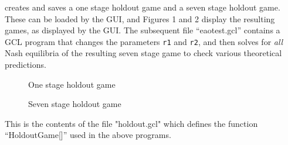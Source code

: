 \noindent
creates and saves a one stage holdout game and a seven stage holdout
game. These can be loaded by the GUI, and Figures 1 and 2 display the
resulting games, as displayed by the GUI.  The subsequent file
``eaotest.gcl'' contains a GCL program that changes the parameters
\verb+r1+ and \verb+r2+, and then solves for {\em all} Nash equilibria
of the resulting seven stage game to check various theoretical predictions.

\begin{figure}[htp]
\caption{One stage holdout game}
\end{figure}
\begin{figure}[htp]
\caption{Seven stage holdout game}
\end{figure}

\newpage
\noindent
This is the contents of the file "holdout.gcl" which defines the
function ``HoldoutGame[]'' used in the above programs.

